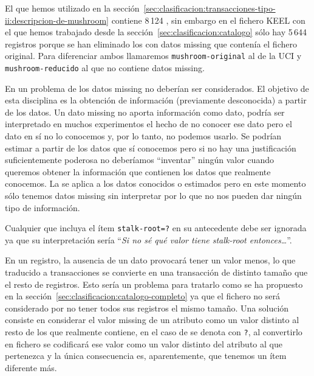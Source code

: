 \ABIERTO
El \dataset \mushroom que hemos utilizado en la sección~\ref{sec:clasificacion:transacciones-tipo-ii:descripcion-de-mushroom} contiene 8\,124 \registros, sin embargo en el fichero KEEL con el que hemos trabajado desde la sección~\ref{sec:clasificacion:catalogo} sólo hay 5\,644 registros porque se han eliminado los \registros con datos missing que contenía el fichero original. Para diferenciar ambos \datasets llamaremos \texttt{mushroom-original} al \dataset de la UCI y \texttt{mushroom-reducido} al que no contiene datos missing.

En un problema de \dm los datos missing no deberían ser considerados. El objetivo de esta disciplina es la obtención de información (previamente desconocida) a partir de los datos. Un dato missing no aporta información como dato, podría ser interpretado en muchos experimentos el hecho de no conocer ese dato pero el dato en sí no lo conocemos y, por lo tanto, no podemos usarlo. Se podrían estimar a partir de los datos que sí conocemos pero si no hay una justificación suficientemente poderosa no deberíamos "`inventar"' ningún valor cuando queremos obtener la información que contienen los datos que realmente conocemos. La \dm se aplica a los datos conocidos o estimados pero en este momento sólo tenemos datos missing sin interpretar por lo que no nos pueden dar ningún tipo de información.

Cualquier \ar que incluya el ítem \texttt{stalk-root=?} en su antecedente debe ser ignorada ya que su interpretación sería "`\emph{Si no sé qué valor tiene stalk-root entonces\ldots}"'.

En un registro, la ausencia de un dato provocará tener un valor menos, lo que traducido a transacciones se convierte en una transacción de distinto tamaño que el resto de registros. Esto sería un problema para tratarlo como se ha propuesto en la sección~\ref{sec:clasificacion:catalogo-completo} ya que el fichero \D no será considerado \catalogo por no tener todos sus registros el mismo tamaño. Una solución consiste en considerar el valor missing de un atributo como un valor distinto al resto de los que realmente contiene, en el caso de \mushroom se denota con \texttt{?}, al convertirlo en fichero \D se codificará ese valor como un valor distinto del atributo al que pertenezca y la única consecuencia es, aparentemente, que tenemos un ítem diferente más.

